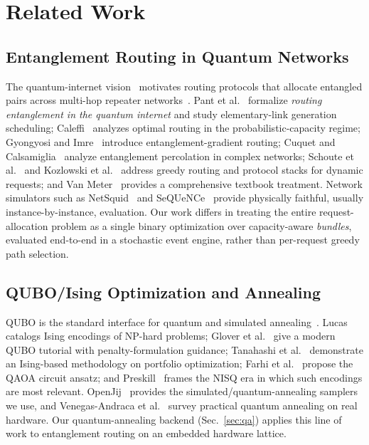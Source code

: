 \documentclass[twocolumn]{article}
\begin{document}
\section{Related Work}
\label{sec:related}

\subsection{Entanglement Routing in Quantum Networks}
\label{sec:related-net}

The quantum-internet vision~\cite{kimble2008quantum,wehner2018quantum,
simon2017towards} motivates routing protocols that allocate
entangled pairs across multi-hop repeater
networks~\cite{briegel1998quantum,dur1999entanglement,
sangouard2011quantum,azuma2023quantum}.  Pant et
al.~\cite{pant2022routing} formalize \emph{routing entanglement in the
quantum internet} and study elementary-link generation scheduling;
Caleffi~\cite{caleffi2017optimal} analyzes optimal routing in the
probabilistic-capacity regime; Gyongyosi and
Imre~\cite{gyongyosi2019entanglement} introduce entanglement-gradient
routing; Cuquet and Calsamiglia~\cite{cuquet2009entanglement} analyze
entanglement percolation in complex networks; Schoute et
al.~\cite{schoute2016shortcuts} and Kozlowski et
al.~\cite{kozlowski2020designing} address greedy routing and protocol
stacks for dynamic requests; and Van Meter~\cite{vanmeter2014quantum}
provides a comprehensive textbook treatment.  Network simulators such
as NetSquid~\cite{coopmans2021netsquid} and
SeQUeNCe~\cite{wu2021sequence} provide physically faithful, usually
instance-by-instance, evaluation.  Our work differs in treating the
entire request-allocation problem as a single binary optimization over
capacity-aware \emph{bundles}, evaluated end-to-end in a stochastic
event engine, rather than per-request greedy path selection.

\subsection{QUBO/Ising Optimization and Annealing}
\label{sec:related-qubo}

QUBO is the standard interface for quantum and simulated
annealing~\cite{kadowaki1998quantum,kirkpatrick1983optimization,
johnson2011quantum,boixo2014evidence}.  Lucas~\cite{lucas2014ising}
catalogs Ising encodings of NP-hard problems; Glover et
al.~\cite{glover2019tutorial} give a modern QUBO tutorial with
penalty-formulation guidance; Tanahashi et al.~\cite{tanahashi2019application}
demonstrate an Ising-based methodology on portfolio optimization;
Farhi et al.~\cite{farhi2014qaoa} propose the QAOA circuit ansatz;
and Preskill~\cite{preskill2018nisq} frames the NISQ era in which such
encodings are most relevant.  OpenJij~\cite{openjij} provides the
simulated/quantum-annealing samplers we use, and
Venegas-Andraca et al.~\cite{venegas2018quantum} survey practical
quantum annealing on real hardware.  Our quantum-annealing backend
(Sec.~\ref{sec:qa}) applies this line of work to entanglement routing
on an embedded hardware lattice.
\end{document}

